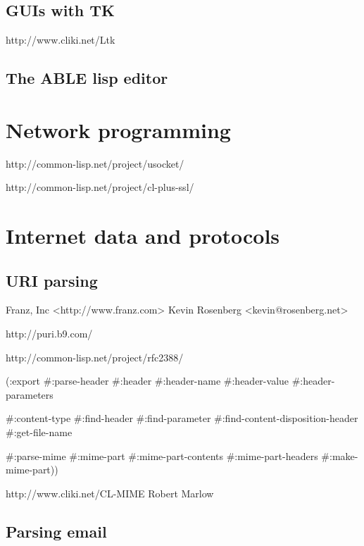 \documentclass[10pt,english]{book}
\begin{document}
\section{GUIs with TK}
\label{sec:guis-with-tk}

http://www.cliki.net/Ltk

\section{The ABLE lisp editor}
\label{sec:able-lisp-editor}



\chapter{Network programming}
\label{cha:network-programming}

http://common-lisp.net/project/usocket/

http://common-lisp.net/project/cl-plus-ssl/



\chapter{Internet data and protocols}
\label{cha:intern-data-prot}

\section{URI parsing}
\label{sec:uri-parsing}

Franz, Inc <http://www.franz.com>
Kevin Rosenberg <kevin@rosenberg.net>

http://puri.b9.com/


http://common-lisp.net/project/rfc2388/

  (:export
   #:parse-header
   #:header
   #:header-name
   #:header-value
   #:header-parameters

   #:content-type
   #:find-header
   #:find-parameter
   #:find-content-disposition-header
   #:get-file-name

   #:parse-mime
   #:mime-part
   #:mime-part-contents
   #:mime-part-headers
   #:make-mime-part))


http://www.cliki.net/CL-MIME
Robert Marlow

\section{Parsing email}
\label{sec:parsing-email}
\end{document}
